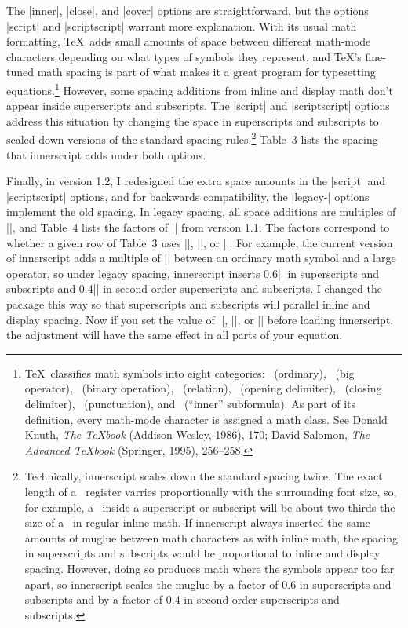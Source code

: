 \documentclass[12pt]{article}
\begin{document}
The |inner|, |close|, and |cover| options are straightforward, but the options |script| and |scriptscript| warrant more explanation. With its usual math formatting, \TeX\ adds small amounts of space between different math-mode characters depending on what types of symbols they represent, and \TeX's fine-tuned math spacing is part of what makes it a great program for typesetting equations.\footnote{\TeX\ classifies math symbols into eight categories: \vrb\mathord\ (ordinary), \vrb\mathop\ (big operator), \vrb\mathbin\ (binary operation), \vrb\mathrel\ (relation), \vrb\mathopen\ (opening delimiter), \vrb\mathclose\ (closing delimiter), \vrb\mathpunct\ (punctuation), and \vrb\mathinner\ (``inner'' subformula). As part of its definition, every math-mode character is assigned a math class.\vadjust{\bigskip} See Donald Knuth, \textit{The \TeX book} (Addison Wesley, 1986), 170; David Salomon, \textit{The Advanced \TeX book} (Springer, 1995), 256--258.} However, some spacing additions from inline and display math don't appear inside superscripts and subscripts. The |script| and |scriptscript| options address this situation by changing the space in superscripts and subscripts to scaled-down versions of the standard spacing rules.\footnote{Technically, \textsf{innerscript} scales down the standard spacing twice. The exact length of a \vrb\muskip\ register varries proportionally with the surrounding font size, so, for example, a \vrb\thinmuskip\ inside a superscript or subscript will be about two-thirds the size of a \vrb\thinmuskip\ in regular inline math. If \textsf{innerscript} always inserted the same amounts of muglue between math characters as with inline math, the spacing in superscripts and subscripts would be proportional to inline and display spacing. However, doing so produces math where the symbols appear too far apart, so \textsf{innerscript} scales the muglue by a factor of 0.6 in superscripts and subscripts and by a factor of 0.4 in second-order superscripts and subscripts.} Table~3 lists the spacing that \textsf{innerscript} adds under both options.

Finally, in version 1.2, I redesigned the extra space amounts in the |script| and |scriptscript| options, and for backwards compatibility, the |legacy-| options implement the old spacing. In legacy spacing, all space additions are multiples of |\thinmuskip|, and Table~4 lists the factors of |\thinmuskip| from version 1.1. The factors correspond to whether a given row of Table~3 uses |\thinmuskip|, |\medmuskip|, or |\thickmuskip|. For example, the current version of \textsf{innerscript} adds a multiple of |\thinmuskip| between an ordinary math symbol and a large operator, so under legacy spacing, \textsf{innerscript} inserts 0.6|\thinmuskip| in superscripts and subscripts and 0.4|\thinmuskip| in second-order superscripts and subscripts. I changed the package this way so that superscripts and subscripts will parallel inline and display spacing. Now if you set the value of |\thinmuskip|, |\medmuskip|, or |\thickmuskip| before loading \textsf{innerscript}, the adjustment will have the same effect in all parts of your equation.
\end{document}
